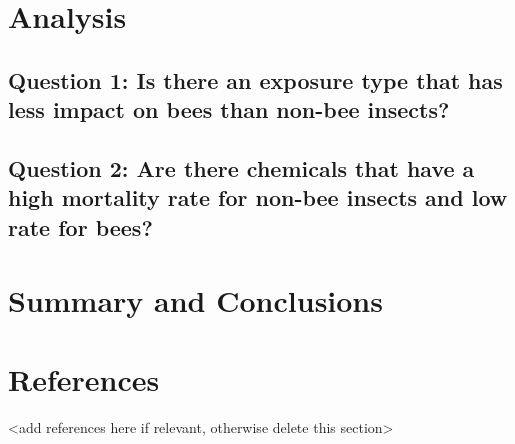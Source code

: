\documentclass[
  12pt,
]{article}
\begin{document}
\newpage

\hypertarget{analysis}{%
\section{Analysis}\label{analysis}}

\hypertarget{question-1-is-there-an-exposure-type-that-has-less-impact-on-bees-than-non-bee-insects}{%
\subsection{Question 1: Is there an exposure type that has less impact
on bees than non-bee
insects?}\label{question-1-is-there-an-exposure-type-that-has-less-impact-on-bees-than-non-bee-insects}}

\hypertarget{question-2-are-there-chemicals-that-have-a-high-mortality-rate-for-non-bee-insects-and-low-rate-for-bees}{%
\subsection{Question 2: Are there chemicals that have a high mortality
rate for non-bee insects and low rate for
bees?}\label{question-2-are-there-chemicals-that-have-a-high-mortality-rate-for-non-bee-insects-and-low-rate-for-bees}}

\newpage

\hypertarget{summary-and-conclusions}{%
\section{Summary and Conclusions}\label{summary-and-conclusions}}

\newpage

\hypertarget{references}{%
\section{References}\label{references}}

\textless add references here if relevant, otherwise delete this
section\textgreater{}
\end{document}
